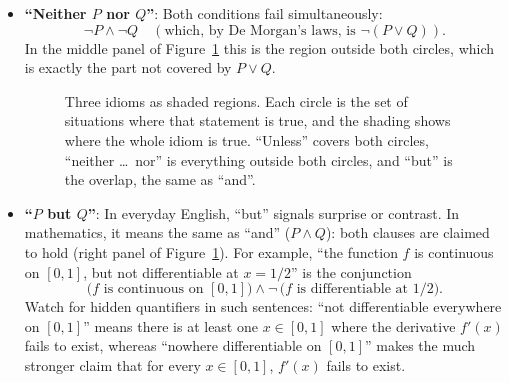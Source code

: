 \begin{itemize}
\item \textbf{``Neither $P$ nor $Q$''}: Both conditions fail simultaneously:
\[
\neg P \land \neg Q \quad (\text{which, by De Morgan's laws, is } \neg(P \lor Q)).
\]
In the middle panel of Figure~\ref{27:fig-idiom-regions} this is the region outside both circles, which is exactly the part not covered by $P \lor Q$.

\begin{figure}[htbp]
\centering
{}
\caption{Three idioms as shaded regions. Each circle is the set of situations where that statement is true, and the shading shows where the whole idiom is true. ``Unless'' covers both circles, ``neither \dots\ nor'' is everything outside both circles, and ``but'' is the overlap, the same as ``and''.}
\label{27:fig-idiom-regions}
\end{figure}

\item \textbf{``$P$ but $Q$''}: In everyday English, ``but'' signals surprise or contrast. In mathematics, it means the same as ``and'' ($P \land Q$): both clauses are claimed to hold (right panel of Figure~\ref{27:fig-idiom-regions}). For example, ``the function $f$ is continuous on $[0,1]$, but not differentiable at $x = 1/2$'' is the conjunction
\[
\text{($f$ is continuous on $[0,1]$)} \land \neg\,\text{($f$ is differentiable at $1/2$)}.
\]
Watch for hidden quantifiers in such sentences: ``not differentiable everywhere on $[0,1]$'' means there is at least one $x \in [0,1]$ where the derivative $f'(x)$ fails to exist, whereas ``nowhere differentiable on $[0,1]$'' makes the much stronger claim that for every $x \in [0,1]$, $f'(x)$ fails to exist.
\end{itemize}

